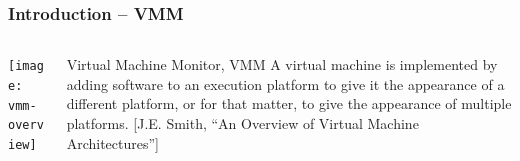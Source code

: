 \begin{frame}[plain]
	\frametitle{Introduction -- VMM}
	
	
	
	\begin{columns}
		
		\begin{column}{.5\textwidth}
			
			\texttt{[image: vmm-overview]}
			
		\end{column}
		
		\begin{column}{.5\textwidth}
			
			
			\begin{block}{Virtual Machine Monitor, VMM}
				A virtual machine is implemented by adding software to an execution platform to give it the appearance of a different platform, or for that matter, to give the appearance of multiple platforms. [J.E. Smith, “An Overview of Virtual Machine Architectures”]
			\end{block}
		\end{column}
		
		
	\end{columns}
	
	
\end{frame}


